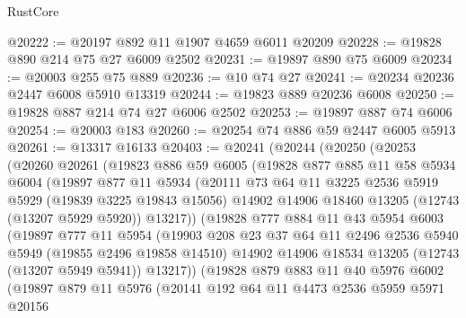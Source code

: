 \begin{lexlean}{RustCore}
\begin{coremodule}
@20222 := @20197 @892 @11 @1907 @4659 @6011 @20209
@20228 := @19828 @890 @214 @75 @27 @6009 @2502
@20231 := @19897 @890 @75 @6009
@20234 := @20003 @255 @75 @889
@20236 := @10 @74 @27
@20241 := @20234 @20236 @2447 @6008 @5910 @13319
@20244 := @19823 @889 @20236 @6008
@20250 := @19828 @887 @214 @74 @27 @6006 @2502
@20253 := @19897 @887 @74 @6006
@20254 := @20003 @183
@20260 := @20254 @74 @886 @59 @2447 @6005 @5913
@20261 := @13317 @16133
@20403 := @20241
    (@20244
      (@20250
        (@20253
          (@20260
            @20261
            (@19823
              @886
              @59
              @6005
              (@19828
                @877
                @885
                @11
                @58
                @5934
                @6004
                (@19897
                  @877
                  @11
                  @5934
                  (@20111
                    @73
                    @64
                    @11
                    @3225
                    @2536
                    @5919
                    @5929
                    (@19839 @3225 @19843 @15056)
                    @14902
                    @14906
                    @18460
                    @13205
                    (@12743 (@13207 @5929 @5920))
                    @13217))
                (@19828
                  @777
                  @884
                  @11
                  @43
                  @5954
                  @6003
                  (@19897
                    @777
                    @11
                    @5954
                    (@19903
                      @208
                      @23
                      @37
                      @64
                      @11
                      @2496
                      @2536
                      @5940
                      @5949
                      (@19855 @2496 @19858 @14510)
                      @14902
                      @14906
                      @18534
                      @13205
                      (@12743 (@13207 @5949 @5941))
                      @13217))
                  (@19828
                    @879
                    @883
                    @11
                    @40
                    @5976
                    @6002
                    (@19897
                      @879
                      @11
                      @5976
                      (@20141
                        @192
                        @64
                        @11
                        @4473
                        @2536
                        @5959
                        @5971
                        @20156

\end{coremodule}
\end{lexlean}
